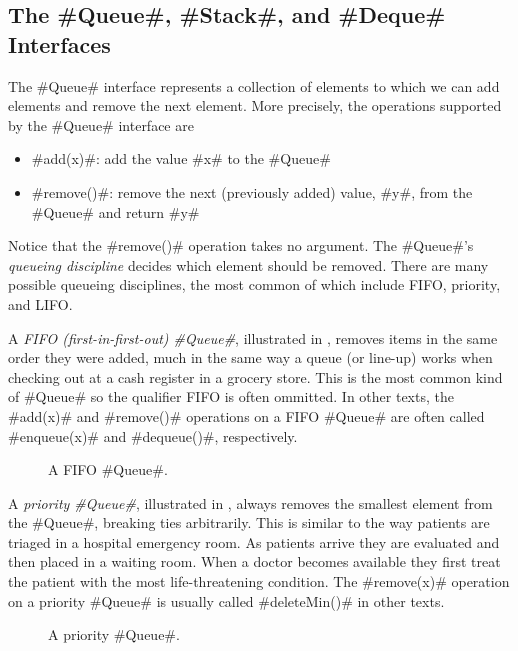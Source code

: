 \subsection{The #Queue#, #Stack#, and #Deque# Interfaces}

The #Queue# interface represents a collection of elements to which we
can add elements and remove the next element.  More precisely, the operations
supported by the #Queue# interface are
\begin{itemize}
  \item #add(x)#: add the value #x# to the #Queue#
  \item #remove()#: remove the next (previously added) value, #y#, from the #Queue# and return #y#
\end{itemize}
Notice that the #remove()# operation takes no argument.  The #Queue#'s
\emph{queueing discipline} decides which element should be removed.
There are many possible queueing disciplines, the most common of which
include FIFO, priority, and LIFO.

A \emph{FIFO (first-in-first-out) #Queue#}, illustrated in ,
removes items in the same order they were added, much in the same
way a queue (or line-up) works when checking out at a cash register
in a grocery store.  This is the most common kind of #Queue# so the
qualifier FIFO is often ommitted.  In other texts, the #add(x)# and
#remove()# operations on a FIFO #Queue# are often called #enqueue(x)#
and #dequeue()#, respectively.

\begin{figure}
  \caption[A FIFO queue]{A FIFO #Queue#.}
\end{figure}

A \emph{priority #Queue#}, illustrated in , always
removes the smallest element from the #Queue#, breaking ties arbitrarily.
This is similar to the way patients are triaged in a hospital emergency
room.  As patients arrive they are evaluated and then placed in a waiting
room.  When a doctor becomes available they first treat the patient with
the most life-threatening condition.  The #remove(x)# operation on a
priority #Queue# is usually called #deleteMin()# in other texts.

\begin{figure}
  \caption[A priority queue]{A priority #Queue#.}
\end{figure}

